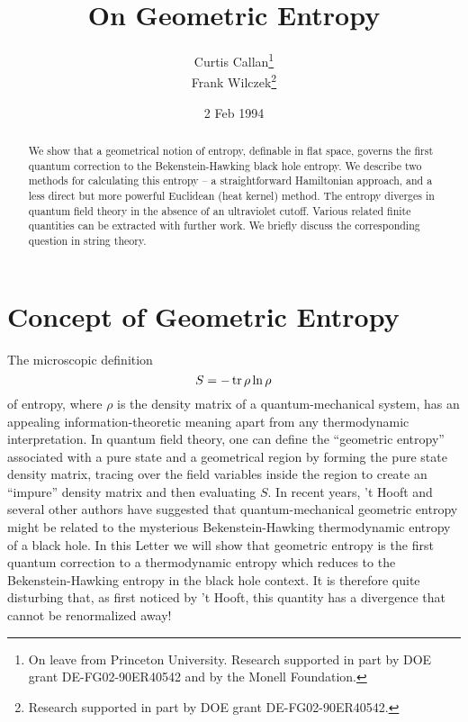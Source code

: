 \documentclass[12pt]{article}
\begin{document}
\title{On Geometric Entropy}
\date{2 Feb 1994}
\author{Curtis Callan\footnote{On leave from Princeton University. Research supported
in part by DOE grant DE-FG02-90ER40542 and by the Monell Foundation.
} \\ Frank Wilczek\footnote{Research supported in part by DOE
grant DE-FG02-90ER40542.}}

\maketitle

\begin{abstract}We show that a geometrical notion of entropy,
definable in flat space, governs the first quantum correction to
the Bekenstein-Hawking black hole entropy.  We describe two methods
for calculating this entropy -- a straightforward Hamiltonian approach,
and a less direct but more powerful Euclidean (heat kernel) method.
The entropy diverges in quantum field theory in the absence of an
ultraviolet cutoff. Various related finite quantities can be
extracted with further work.  We briefly discuss the corresponding
question in string theory.
\end{abstract}

\def\tr{\mathop{\rm tr}}

\section{Concept of Geometric Entropy}


The microscopic definition $$S=-\tr\rho \ln \rho$$ of entropy, where
$\rho$ is the density matrix of a quantum-mechanical system, has an appealing
information-theoretic meaning apart from any thermodynamic interpretation.
In quantum field theory, one can define the ``geometric entropy'' associated
with a pure state and a geometrical region by forming the pure state density
matrix, tracing over the field variables inside the region to create an
``impure'' density matrix and then evaluating $S$. In recent years, 't Hooft
\cite{tHooft} and several other authors \cite{Bombelli,Holzhey,Srednicki}
have suggested that quantum-mechanical geometric entropy might be related to
the mysterious Bekenstein-Hawking thermodynamic entropy of a black hole.
In this Letter we will show that geometric entropy is the first quantum
correction to a thermodynamic entropy which reduces to the Bekenstein-Hawking
entropy in the black hole context. It is therefore quite disturbing that,
as first noticed by 't Hooft, this quantity has a divergence that cannot be
renormalized away!
\end{document}
